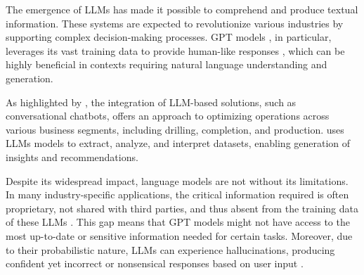         The emergence of LLMs has made it possible to comprehend and produce textual information. These systems are expected to revolutionize various industries by supporting complex decision-making processes. GPT models \cite{OpenAI2023}, in particular, leverages its vast training data to provide human-like responses \cite{Mosser2024}, which can be highly beneficial in contexts requiring natural language understanding and generation. 
        
        As highlighted by \cite{Singh2023}, the integration of LLM-based solutions, such as conversational chatbots, offers an approach to optimizing operations across various business segments, including drilling, completion, and production. \cite{Singh2023} uses LLMs models to extract, analyze, and interpret datasets, enabling generation of insights and recommendations. 

        Despite its widespread impact, language models are not without its limitations. In many industry-specific applications, the critical information required is often proprietary, not shared with third parties, and thus absent from the training data of these LLMs \cite{Mosser2024}. This gap means that GPT models might not have access to the most up-to-date or sensitive information needed for certain tasks. Moreover, due to their probabilistic nature, LLMs can experience hallucinations, producing confident yet incorrect or nonsensical responses based on user input \cite{OpenAI2023}. 

    


